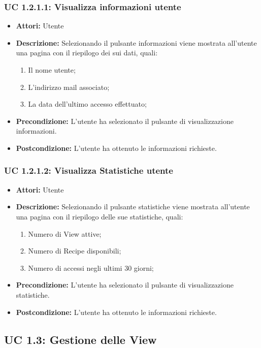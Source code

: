 \subsubsection{UC 1.2.1.1: Visualizza informazioni utente}

\begin{itemize}
\item \textbf{Attori:} Utente
\item \textbf{Descrizione:} Selezionando il pulsante informazioni viene mostrata all'utente una pagina con il riepilogo dei sui dati, quali:
\begin{enumerate}
\item Il nome utente;
\item L'indirizzo mail associato;
\item La data dell'ultimo accesso effettuato;
\end{enumerate}
\item \textbf{Precondizione:} L'utente ha selezionato il pulsante di visualizzazione informazioni.
\item \textbf{Postcondizione:} L'utente ha ottenuto le informazioni richieste.
\end{itemize}

\subsubsection{UC 1.2.1.2: Visualizza Statistiche utente}

\begin{itemize}
\item \textbf{Attori:} Utente
\item \textbf{Descrizione:} Selezionando il pulsante statistiche viene mostrata all'utente una pagina con il riepilogo delle sue statistiche, quali:
\begin{enumerate}
\item Numero di View attive;
\item Numero di Recipe disponibili;
\item Numero di accessi negli ultimi 30 giorni;
\end{enumerate}
\item \textbf{Precondizione:} L'utente ha selezionato il pulsante di visualizzazione statistiche.
\item \textbf{Postcondizione:} L'utente ha ottenuto le informazioni richieste.
\end{itemize}



\subsection{UC 1.3: Gestione delle View}

